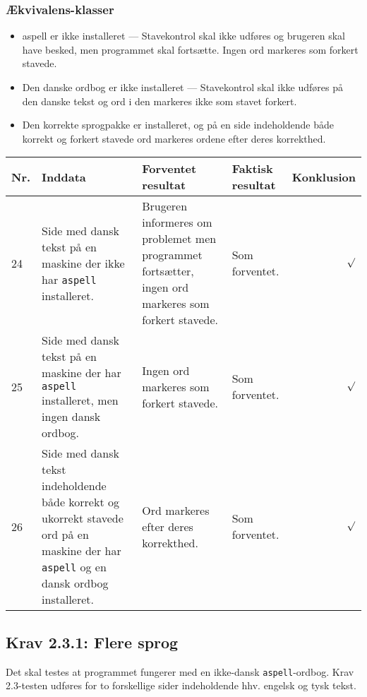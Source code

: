 \documentclass[a4paper,oneside,article]{memoir}
\begin{document}
\begin{landscape}
\subsubsection{Ækvivalens-klasser}
\begin{itemize}
\item aspell er ikke installeret --- Stavekontrol skal ikke udføres og
  brugeren skal have besked, men programmet skal fortsætte. Ingen ord
  markeres som forkert stavede.
\item Den danske ordbog er ikke installeret --- Stavekontrol skal ikke
  udføres på den danske tekst og ord i den markeres ikke som stavet
  forkert.
\item Den korrekte sprogpakke er installeret, og på en side
  indeholdende både korrekt og forkert stavede ord markeres ordene
  efter deres korrekthed. 
\end{itemize}

\begin{longtable}[c]{p{20pt}|p{220pt}|p{130pt}|p{130pt}|r}
\textbf{Nr.} &
\textbf{Inddata} &
\textbf{Forventet resultat} &
\textbf{Faktisk resultat} &
\textbf{Konklusion} \\ \hline

24 &
Side med dansk tekst på en maskine der ikke har \texttt{aspell}
installeret. &
Brugeren informeres om problemet men programmet fortsætter, ingen ord
markeres som forkert stavede. &
Som forventet. &
$\surd$ \\ \hline

25 &
Side med dansk tekst på en maskine der har \texttt{aspell}
installeret, men ingen dansk ordbog. &
Ingen ord markeres som forkert stavede. &
Som forventet. &
$\surd$ \\ \hline

26 &
Side med dansk tekst indeholdende både korrekt og ukorrekt stavede ord
på en maskine der har \texttt{aspell}
og en dansk ordbog installeret. &
Ord markeres efter deres korrekthed. &
Som forventet. &
$\surd$ \\ \hline

\end{longtable}

\subsection{Krav 2.3.1: Flere sprog}

Det skal testes at programmet fungerer med en ikke-dansk
\texttt{aspell}-ordbog. Krav 2.3-testen udføres for to forskellige
sider indeholdende hhv. engelsk og tysk tekst.


\end{landscape}
\end{document}
